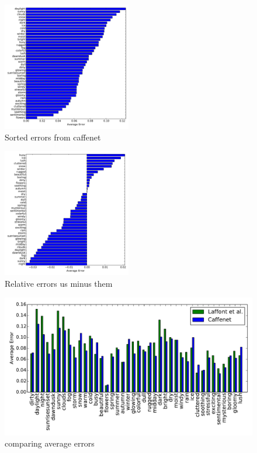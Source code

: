 \documentclass{article}
\begin{document}
 
 
%
%
%


\begin{figure}[t]
	\centering
		\includegraphics[width=0.5\textwidth]{figs/sorted_err.pdf}
		\caption{Sorted errors from caffenet}\label{fig:sort}
\end{figure}

\begin{figure}[t]
	\centering
		\includegraphics[width=0.5\textwidth]{figs/rel_err.pdf}
		\caption{Relative errors us minus them}\label{fig:relerr}
\end{figure}

\begin{figure}[t]
	\centering
		\includegraphics[width=1.0\textwidth]{figs/avg_err_compare.pdf}
		\caption{comparing average errors}\label{fig:compare}
\end{figure}
\end{document}
